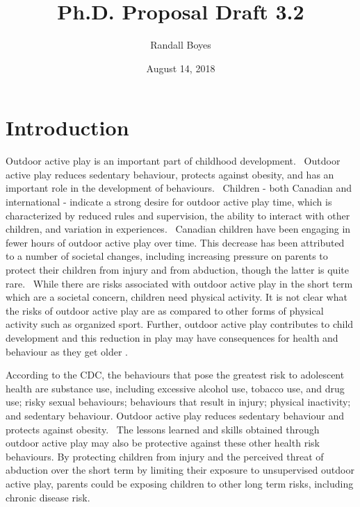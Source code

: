 \documentclass [11pt]{article}
\title{Ph.D. Proposal Draft 3.2}
\author{Randall Boyes}
\date{August 14, 2018}
\begin{document}
\maketitle


\section{Introduction}
Outdoor active play is an important part of childhood development.~\cite{Curtis2012-ql,Pearce2008-lq,Pernsteiner2012-qm} Outdoor active play reduces sedentary behaviour, protects against obesity, and has an important role in the development of behaviours.~\cite{Ansari2015-ig} Children - both Canadian and international - indicate a strong desire for outdoor active play time, which is characterized by reduced rules and supervision, the ability to interact with other children, and variation in experiences.~\cite{Watson2016-qd,Caro2016-er,Herrington2015-pb} Canadian children have been engaging in fewer hours of outdoor active play over time. This decrease has been attributed to a number of societal changes, including increasing pressure on parents to protect their children from injury and from abduction, though the latter is quite rare.~\cite{Mitra2014-qg} While there are risks associated with outdoor active play in the short term which are a societal concern, children need physical activity. It is not clear what the risks of outdoor active play are as compared to other forms of physical activity such as organized sport. Further, outdoor active play contributes to child development and this reduction in play may have consequences for health and behaviour as they get older \cite{barker2014less}. 

According to the CDC, the behaviours that pose the greatest risk to adolescent health are substance use, including excessive alcohol use, tobacco use, and drug use; risky sexual behaviours; behaviours that result in injury; physical inactivity; and sedentary behaviour. Outdoor active play reduces sedentary behaviour and protects against obesity.~\cite{Ansari2015-ig} The lessons learned and skills obtained through outdoor active play may also be protective against these other health risk behaviours. By protecting children from injury and the perceived threat of abduction over the short term by limiting their exposure to unsupervised outdoor active play, parents could be exposing children to other long term risks, including chronic disease risk.
\end{document}
